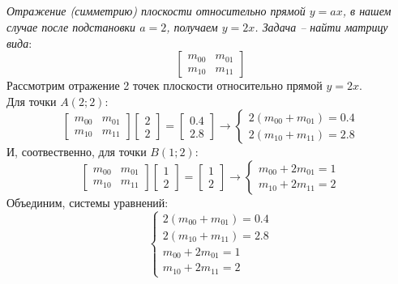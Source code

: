 \documentclass[a5paper, 10pt]{article}
\theoremstyle{definition}
\theoremstyle{plain}
\theoremstyle{remark}
\begin{document}
\subsection{}
\textit{Отражение (симметрию) плоскости относительно прямой $y=ax$, в нашем случае после подстановки $a=2$, получаем $y=2x$. Задача -- найти матрицу вида}:
\begin{equation}
\begin{bmatrix}
m_{0 0} & m_{0 1}\\
m_{1 0} & m_{1 1}
\end{bmatrix}
\end{equation}
Рассмотрим отражение 2 точек плоскости относительно прямой  $y=2x$.\\
Для точки $A (2; 2)$:
\begin{equation}
\begin{bmatrix}
m_{0 0} & m_{0 1}\\
m_{1 0} & m_{1 1}
\end{bmatrix}
\begin{bmatrix}
2\\
2
\end{bmatrix}
=
\begin{bmatrix}
0.4\\
2.8
\end{bmatrix}
\to
\begin{cases}
2(m_{0 0} +  m_{0 1}) = 0.4\\
2(m_{1 0} + m_{1 1}) = 2.8
\end{cases}
\end{equation}
И, соотвественно, для точки $B(1;2)$:
\begin{equation}
\begin{bmatrix}
m_{0 0} & m_{0 1}\\
m_{1 0} & m_{1 1}
\end{bmatrix}
\begin{bmatrix}
1\\
2
\end{bmatrix}
=
\begin{bmatrix}
1\\
2
\end{bmatrix}
\to
\begin{cases}
m_{0 0} +  2m_{0 1} = 1\\
m_{1 0} + 2m_{1 1} = 2
\end{cases}
\end{equation}
Объединим, системы уравнений:
\begin{equation}
\begin{cases}
2(m_{0 0} +  m_{0 1}) = 0.4\\
2(m_{1 0} + m_{1 1}) = 2.8\\
m_{0 0} +  2m_{0 1} = 1\\
m_{1 0} + 2m_{1 1} = 2
\end{cases}
\end{equation}
\end{document}
